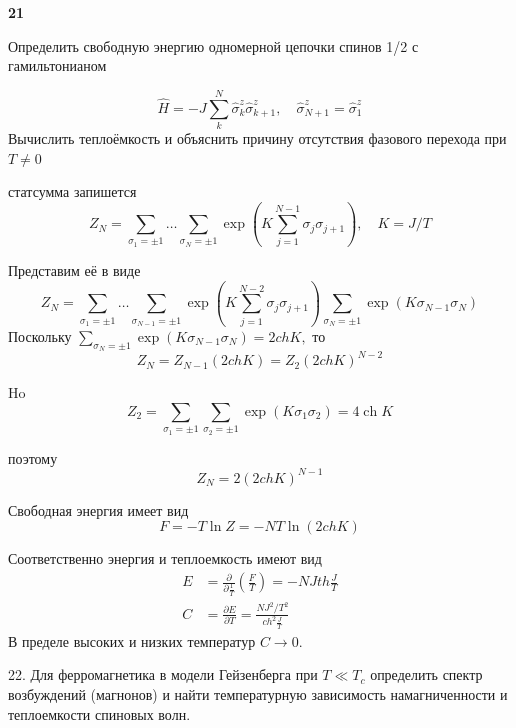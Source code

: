 \documentclass[a4paper,12pt]{article} %
\begin{document}
\begin{ttask} \textbf{21}

Определить свободную энергию одномерной цепочки спинов 1/2 с гамильтонианом

$$\hat{H}
=
-J \sum_{k}^{N} \hat{\sigma}_{k}^{z} \hat{\sigma}_{k+1}^{z}, \quad \hat{\sigma}_{N+1}^{z}
=
\hat{\sigma}_{1}^{z}$$
Вычислить теплоёмкость и объяснить причину отсутствия фазового перехода при $ T\ne 0 $




статсумма запишется
$$
Z_{N}=
\sum_{\sigma_{1}=\pm 1} \ldots \sum_{\sigma_{N}=\pm 1} 
\exp 
\left(K \sum_{j=1}^{N-1} \sigma_{j} \sigma_{j+1}\right), 
\quad
K=J / T
$$


Представим её в виде
$$
Z_{N}=\sum_{\sigma_{1}=\pm 1} \ldots \sum_{\sigma_{N-1}=\pm 1} \exp \left(K \sum_{j=1}^{N-2} \sigma_{j} \sigma_{j+1}\right) \sum_{\sigma_{N}=\pm 1} \exp \left(K \sigma_{N-1} \sigma_{N}\right)
$$
Поскольку 
$\sum_{\sigma_{N}=\pm 1} 
\exp \left(K \sigma_{N-1} \sigma_{N}\right)
=2  ch K,$ 
то
$$
Z_{N}=Z_{N-1}(2 c h K)=Z_{2}(2 c h K)^{N-2}
$$



Ho
$$
Z_{2}=\sum_{\sigma_{1}=\pm 1} \sum_{\sigma_{2}=\pm 1} \exp \left(K \sigma_{1} \sigma_{2}\right)=4 \operatorname{ch} K
$$

поэтому
$$
Z_{N}=2(2 c h K)^{N-1}
$$



Свободная энергия имеет вид
$$
F=-T \ln Z=-N T \ln (2 c h K)
$$




Соответственно энергия и теплоемкость имеют вид
$$
\begin{aligned}
	E &=\frac{\partial}{\partial \frac{1}{T}}\left(\frac{F}{T}\right)=-N J t h \frac{J}{T} \\
	C &=\frac{\partial E}{\partial T}=\frac{N J^{2} / T^{2}}{c h^{2} \frac{J}{T}}
\end{aligned}
$$
В пределе высоких и низких температур $C \rightarrow 0 .$







\end{ttask}



\begin{ttask}

22. Для ферромагнетика в модели Гейзенберга при $ T \ll T_c $ определить спектр возбуждений (магнонов) и найти температурную зависимость намагниченности и теплоемкости спиновых волн.

















\end{ttask}
\end{document}
